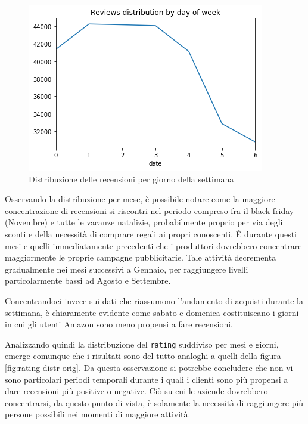\documentclass[hidelinks, 12pt]{article}
\begin{document}
\begin{figure}[H]
	\centering
	\includegraphics[scale=0.7]{images/02_04_day_distr.png}
	\caption[Distribuzione delle recensioni per giorno della settimana]{Distribuzione delle recensioni per giorno della settimana}
	\label{fig:day-distr}
\end{figure}

Osservando la distribuzione per mese, è possibile notare come la maggiore concentrazione di recensioni si riscontri nel periodo compreso fra il black friday (Novembre) e tutte le vacanze natalizie, probabilmente proprio per via degli sconti e della necessità di comprare regali ai propri conoscenti. É durante questi mesi e quelli immediatamente precedenti che i produttori dovrebbero concentrare maggiormente le proprie campagne pubblicitarie. Tale attività decrementa gradualmente nei mesi successivi a Gennaio, per raggiungere livelli particolarmente bassi ad Agosto e Settembre.

Concentrandoci invece sui dati che riassumono l'andamento di acquisti durante la settimana, è chiaramente evidente come sabato e domenica costituiscano i giorni in cui gli utenti Amazon sono meno propensi a fare recensioni.

Analizzando quindi la distribuzione del \texttt{rating} suddiviso per mesi e giorni, emerge comunque che i risultati sono del tutto analoghi a quelli della figura \ref{fig:rating-distr-orig}. Da questa osservazione si potrebbe concludere che non vi sono particolari periodi temporali durante i quali i clienti sono più propensi a dare recensioni più positive o negative. Ciò su cui le aziende dovrebbero concentrarsi, da questo punto di vista, è solamente la necessità di raggiungere più persone possibili nei momenti di maggiore attività.



\clearpage
\end{document}
